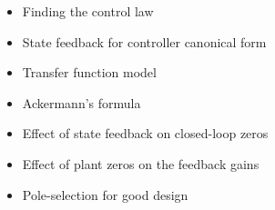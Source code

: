 
\ifslidesonly
\begin{slide}
   
\end{slide}
\fi



\ifslidesonly
\begin{slide}
   
\end{slide}
\fi







\ifslidesonly
\begin{slide}
   \begin{itemize}
   	\item Finding the control law
   	\item State feedback for controller canonical form
   	\item Transfer function model
   	\item Ackermann's formula
   	\item Effect of state feedback on closed-loop zeros
   	\item Effect of plant zeros on the feedback gains
   	\item Pole-selection for good design
   \end{itemize}
\end{slide}
\fi


\endinput

